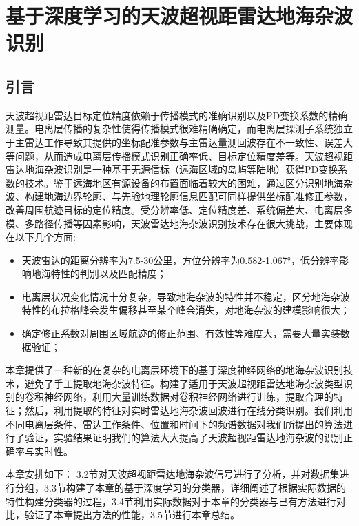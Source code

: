 \chapter{基于深度学习的天波超视距雷达地海杂波识别}
\section{引言}


天波超视距雷达目标定位精度依赖于传播模式的准确识别以及PD变换系数的精确测量。电离层传播的复杂性使得传播模式很难精确确定，而电离层探测子系统独立于主雷达工作导致其提供的坐标配准参数与主雷达量测回波存在不一致性、误差大等问题，从而造成电离层传播模式识别正确率低、目标定位精度差等。天波超视距雷达地海杂波识别是一种基于无源信标（远海区域的岛屿等陆地）获得PD变换系数的技术。鉴于远海地区有源设备的布置面临着较大的困难，通过区分识别地海杂波、构建地海边界轮廓、与先验地理轮廓信息匹配可同样提供坐标配准修正参数，改善周围航迹目标的定位精度。受分辨率低、定位精度差、系统偏差大、电离层多模、多路径传播等因素影响，天波雷达地海杂波识别技术存在很大挑战，主要体现在以下几个方面:
\begin{itemize}
	\item 天波雷达的距离分辨率为7.5-30公里，方位分辨率为0.582-1.067°，低分辨率影响地海特性的判别以及匹配精度；
	\item 电离层状况变化情况十分复杂，导致地海杂波的特性并不稳定，区分地海杂波特性的布拉格峰会发生偏移甚至某个峰会消失，对地海杂波的建模影响很大；
	\item 确定修正系数对周围区域航迹的修正范围、有效性等难度大，需要大量实装数据验证；
\end{itemize}

本章提供了一种新的在复杂的电离层环境下的基于深度神经网络的地海杂波识别技术，避免了手工提取地海杂波特征。构建了适用于天波超视距雷达地海杂波类型识别的卷积神经网络，利用大量训练数据对卷积神经网络进行训练，提取合理的特征；然后，利用提取的特征对实时雷达地海杂波回波进行在线分类识别。我们利用不同电离层条件、雷达工作条件、位置和时间下的频谱数据对我们所提出的算法进行了验证，实验结果证明我们的算法大大提高了天波超视距雷达地海杂波的识别正确率与实时性。

本章安排如下： 3.2节对天波超视距雷达地海杂波信号进行了分析，并对数据集进行分组，3.3节构建了本章的基于深度学习的分类器，详细阐述了根据实际数据的特性构建分类器的过程，3.4节利用实际数据对于本章的分类器与已有方法进行对比，验证了本章提出方法的性能，3.5节进行本章总结。

